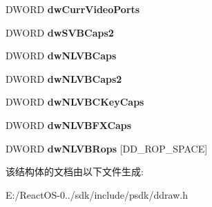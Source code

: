 \begin{DoxyCompactItemize}
D\+W\+O\+RD {\bfseries dw\+Curr\+Video\+Ports}
\item 
\mbox{\label{struct___d_d_c_a_p_s___d_x5_aeedd7dc5d216e6641679b626da6e6a82}} 
D\+W\+O\+RD {\bfseries dw\+S\+V\+B\+Caps2}
\item 
\mbox{\label{struct___d_d_c_a_p_s___d_x5_ad773d65abe12d55c474a266594388977}} 
D\+W\+O\+RD {\bfseries dw\+N\+L\+V\+B\+Caps}
\item 
\mbox{\label{struct___d_d_c_a_p_s___d_x5_a938b2a058242afae422d87a4215eaed8}} 
D\+W\+O\+RD {\bfseries dw\+N\+L\+V\+B\+Caps2}
\item 
\mbox{\label{struct___d_d_c_a_p_s___d_x5_ac7f033b735032a7f45268e50981d06b9}} 
D\+W\+O\+RD {\bfseries dw\+N\+L\+V\+B\+C\+Key\+Caps}
\item 
\mbox{\label{struct___d_d_c_a_p_s___d_x5_a359c2934f4da44959b0c37faeed6e340}} 
D\+W\+O\+RD {\bfseries dw\+N\+L\+V\+B\+F\+X\+Caps}
\item 
\mbox{\label{struct___d_d_c_a_p_s___d_x5_a7ebd19c4f8336667cf335558dbac2790}} 
D\+W\+O\+RD {\bfseries dw\+N\+L\+V\+B\+Rops} \mbox{[}D\+D\+\_\+\+R\+O\+P\+\_\+\+S\+P\+A\+CE\mbox{]}
\end{DoxyCompactItemize}


该结构体的文档由以下文件生成\+:\begin{DoxyCompactItemize}
\item 
E\+:/\+React\+O\+S-\/0../sdk/include/psdk/ddraw.\+h\end{DoxyCompactItemize}
